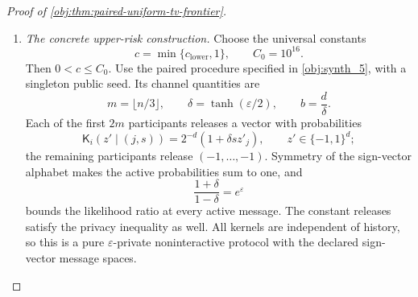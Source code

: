 \documentclass[11pt]{article}
\begin{document}
\begin{proof}[Proof of \cref{obj:thm:paired-uniform-tv-frontier}]
\begin{enumerate}
Now define the two-point amplitude
\[
\alpha_{\mathrm{two}}
=\frac18\min\{1,t^{-1/2}\}\in(0,1/2].
\]
Consider the paired laws with constant contrast zero and constant contrast
\(\alpha_{\mathrm{two}}\). Their targets are zero and
\(\alpha_{\mathrm{two}}/2\).
Applying \cref{obj:lem:adaptive-moment-contraction} at matching order one through the bridge in \cref{obj:prop:signed-causal-bridge} gives
\[
\operatorname{TV}\!\left(
\mathcal L_{P_0,\mathsf K}(R,\mathbf Z^{\mathsf K}),
\mathcal L_{P_{\alpha_{\mathrm{two}}\mathbf1},\mathsf K}
(R,\mathbf Z^{\mathsf K})
\right)
\le
\alpha_{\mathrm{two}}\sqrt n\,\varepsilon
\le\frac18.
\]
Here \(P_{\alpha_{\mathrm{two}}\mathbf1}\) denotes the law with
\(\theta_j=\alpha_{\mathrm{two}}\) for every \(j\).
The preceding decision reduction, with deterministic targets and
\(\omega=1/8\), therefore yields
\[
\mathcal R_{\mathsf K}(\widehat D)
\ge\frac{63\alpha_{\mathrm{two}}^2}{4096}
\ge\frac1{8192}\min\{1,t^{-1}\},
\]
\[
\mathcal H_{\mathsf K}(J_{\mathrm{TV}})
\ge\frac{81\alpha_{\mathrm{two}}}{320}
\ge\frac1{8192}\min\{1,t^{-1/2}\}.
\]
The calibrations use
\[
\alpha_{\mathrm{two}}^2
=\frac1{64}\min\{1,t^{-1}\}.
\]

If \(d\le D_{\mathrm{cut}}\), the elementary upper comparison implies
\[
\rho(t,d)
\le4D_{\mathrm{cut}}^2\min\{1,t^{-1}\},
\]
and taking square roots gives
\[
\sqrt{\rho(t,d)}
\le2D_{\mathrm{cut}}\min\{1,t^{-1/2}\}
\le4D_{\mathrm{cut}}^2\min\{1,t^{-1/2}\}.
\]
Define
\[
c_{\mathrm{small}}=\frac1{32768D_{\mathrm{cut}}^2},
\qquad
c_{\mathrm{lower}}=\min\{c_{\mathrm{large}},c_{\mathrm{small}}\}>0.
\]
The cases \(d\le D_{\mathrm{cut}}\) and \(d>D_{\mathrm{cut}}\) now give, for every sequential paired protocol and every admissible decision,
\[
\mathcal R_{\mathsf K}(\widehat D)\ge
c_{\mathrm{lower}}\rho(t,d),
\qquad
\mathcal H_{\mathsf K}(J_{\mathrm{TV}})\ge
c_{\mathrm{lower}}\sqrt{\rho(t,d)}.
\]
Every noninteractive protocol is sequential. Taking the decision and protocol infima in \cref{obj:def:tv-private-decision-values} therefore proves these lower bounds for both classes.

\item \textit{The concrete upper-risk construction.}
Choose the universal constants
\[
c=\min\{c_{\mathrm{lower}},1\},
\qquad C_0=10^{16}.
\]
Then \(0<c\le C_0\).
Use the paired procedure specified in \cref{obj:synth_5}, with a singleton public seed. Its channel quantities are
\[
m=\lfloor n/3\rfloor,\qquad
\delta=\tanh(\varepsilon/2),\qquad b=\frac d\delta.
\]
Each of the first \(2m\) participants releases a vector with probabilities
\[
\mathsf K_i(z'\mid(j,s))
=2^{-d}(1+\delta s z'_j),
\qquad z'\in\{-1,1\}^d;
\]
the remaining participants release \((-1,\ldots,-1)\).
Symmetry of the sign-vector alphabet makes the active probabilities sum to one, and
\[
\frac{1+\delta}{1-\delta}=e^\varepsilon
\]
bounds the likelihood ratio at every active message. The constant releases satisfy the privacy inequality as well. All kernels are independent of history, so this is a pure \(\varepsilon\)-private noninteractive protocol with the declared sign-vector message spaces.


\end{enumerate}
\end{proof}
\end{document}
